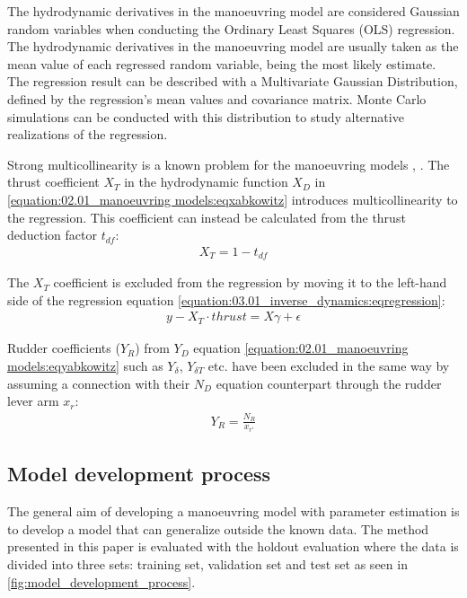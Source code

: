 \noindent The hydrodynamic derivatives in the manoeuvring model are considered Gaussian random variables when conducting the Ordinary Least Squares (OLS) regression. The hydrodynamic derivatives in the manoeuvring model are usually taken as the mean value of each regressed random variable, being the most likely estimate. The regression result can be described with a Multivariate Gaussian Distribution, defined by the regression’s mean values and covariance matrix. Monte Carlo simulations can be conducted with this distribution to study alternative realizations of the regression.


Strong multicollinearity is a known problem for the manoeuvring models \cite{luo_parameter_2016}, \cite{wang_quantifying_2018}.
The thrust coefficient \(X_T\) in the hydrodynamic function \(X_D\) in \autoref{equation:02.01_manoeuvring models:eqxabkowitz} introduces multicollinearity to the regression. This coefficient can instead be calculated from the thrust deduction factor \(t_{df}\):
\begin{equation}\label{equation:03.01_inverse_dynamics:eqXthrust}
\begin{split}\displaystyle X_{T} = 1 - t_{df}\end{split}
\end{equation}

\noindent The \(X_T\) coefficient is excluded from the regression by moving it to the left-hand side of the regression equation \autoref{equation:03.01_inverse_dynamics:eqregression}:
\begin{equation}\label{equation:03.01_inverse_dynamics:eqexclude}
\begin{split}y-X_T \cdot thrust = X \gamma + \epsilon\end{split}
\end{equation}

\noindent Rudder coefficients (\(Y_R\)) from \(Y_D\) equation \autoref{equation:02.01_manoeuvring models:eqyabkowitz} such as \(Y_{\delta}\), \(Y_{\delta T}\) etc. have been excluded in the same way by assuming a connection with their \(N_D\) equation counterpart through the rudder lever arm \(x_r\):
\begin{equation}\label{equation:03.01_inverse_dynamics:eqyr}
\begin{split}\displaystyle Y_{R} = \frac{N_{R}}{x_{r'}}\end{split}
\end{equation}

\subsection{Model development process}
\label{sec:model_development_process}
The general aim of developing a manoeuvring model with parameter estimation is to develop a model that can generalize outside the known data. The method presented in this paper is evaluated with the holdout evaluation \cite{sammut_holdout_2017} where the data is divided into three sets: training set, validation set and test set as seen in \autoref{fig:model_development_process}.

